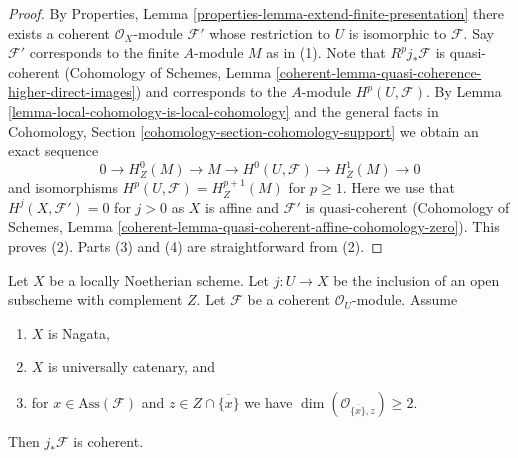\begin{proof}
By Properties, Lemma \ref{properties-lemma-extend-finite-presentation}
there exists a coherent $\mathcal{O}_X$-module $\mathcal{F}'$
whose restriction to $U$ is isomorphic to $\mathcal{F}$.
Say $\mathcal{F}'$ corresponds to the finite $A$-module $M$
as in (1).
Note that $R^pj_*\mathcal{F}$ is quasi-coherent
(Cohomology of Schemes, Lemma
\ref{coherent-lemma-quasi-coherence-higher-direct-images})
and corresponds to the $A$-module $H^p(U, \mathcal{F})$.
By Lemma \ref{lemma-local-cohomology-is-local-cohomology}
and the general facts in
Cohomology, Section \ref{cohomology-section-cohomology-support}
we obtain an exact sequence
$$
0 \to H^0_Z(M) \to M \to H^0(U, \mathcal{F}) \to H^1_Z(M) \to 0
$$
and isomorphisms $H^p(U, \mathcal{F}) = H^{p + 1}_Z(M)$ for $p \geq 1$.
Here we use that $H^j(X, \mathcal{F}') = 0$ for $j > 0$ as $X$ is affine
and $\mathcal{F}'$ is quasi-coherent (Cohomology of Schemes,
Lemma \ref{coherent-lemma-quasi-coherent-affine-cohomology-zero}).
This proves (2).
Parts (3) and (4) are straightforward from (2).
\end{proof}

\begin{lemma}
\label{lemma-finiteness-pushforward}
Let $X$ be a locally Noetherian scheme.
Let $j : U \to X$ be the inclusion of an
open subscheme with complement $Z$. Let $\mathcal{F}$ be a coherent
$\mathcal{O}_U$-module. Assume
\begin{enumerate}
\item $X$ is Nagata,
\item $X$ is universally catenary, and
\item for $x \in \text{Ass}(\mathcal{F})$ and
$z \in Z \cap \overline{\{x\}}$ we have
$\dim(\mathcal{O}_{\overline{\{x\}}, z}) \geq 2$.
\end{enumerate}
Then $j_*\mathcal{F}$ is coherent.
\end{lemma}

